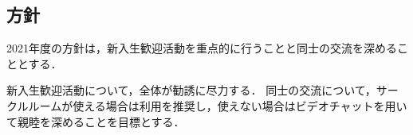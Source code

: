 \subsection*{\newGradeIfKouki{}\secondGrade{}方針}


2021年度の\newGradeIfKouki{}\secondGrade{}方針は，新入生歓迎活動を重点的に行うことと\secondGrade{}同士の交流を深めることとする．

新入生歓迎活動について，\secondGrade{}全体が勧誘に尽力する．
\secondGrade{}同士の交流について，サークルルームが使える場合は利用を推奨し，使えない場合はビデオチャットを用いて親睦を深めることを目標とする．
